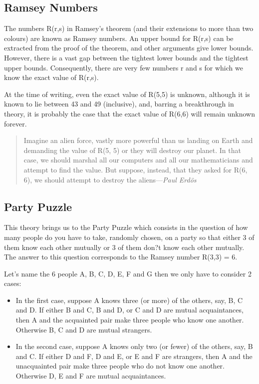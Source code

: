 	\subsection{Ramsey Numbers}

		The numbers R(r,s) in Ramsey's theorem (and their extensions to more
		than two colours) are known as Ramsey numbers. An upper bound for R(r,s)
		can be extracted from the proof of the theorem, and other arguments give
		lower bounds. However, there is a vast gap between the tightest lower
		bounds and the tightest upper bounds. Consequently, there are very few
		numbers r and s for which we know the exact value of R(r,s).

		At the time of writing, even the exact value of R(5,5) is unknown,
		although it is known to lie between 43 and 49 (inclusive), and, barring
		a breakthrough in theory, it is probably the case that the exact value
		of R(6,6) will remain unknown forever.

		\begin{quotation}

			Imagine an alien force, vastly more powerful than us landing on
			Earth and demanding the value of R(5, 5) or they will destroy our
			planet. In that case, we should marshal all our computers and all
			our mathematicians and attempt to find the value. But suppose,
			instead, that they asked for R(6, 6), we should attempt to destroy
			the aliens---\emph{Paul Erd\"os}

		\end{quotation}

	\subsection{Party Puzzle}

		This theory brings us to the Party Puzzle which consists in the question
		of how many people do you have to take, randomly chosen, on a party so
		that either 3 of them know each other mutually or 3 of them don?t know
		each other mutually. The answer to this question corresponds to the
		Ramsey number R(3,3) = 6.

		Let's name the 6 people A, B, C, D, E, F and G then we only have to
		consider 2 cases:

		\begin{itemize}

			\item In the first case, suppose A knows three (or more) of the
			others, say, B, C and D. If either B and C, B and D, or C and D are
			mutual acquaintances, then A and the acquainted pair make three
			people who know one another. Otherwise B, C and D are mutual
			strangers.

			\item In the second case, suppose A knows only two (or fewer) of the
			others, say, B and C. If either D and F, D and E, or E and F are
			strangers, then A and the unacquainted pair make three people who do
			not know one another. Otherwise D, E and F are mutual acquaintances.

		\end{itemize}

